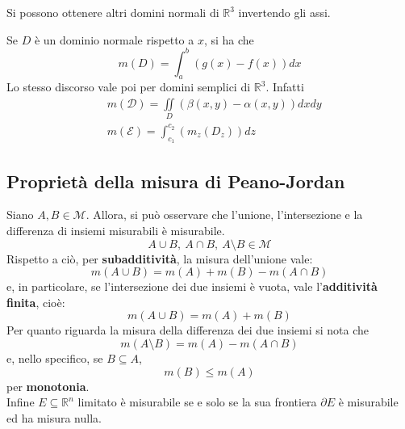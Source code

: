     \begin{oss}
        Si possono ottenere altri domini normali di $\mathbb{R}^3$ invertendo gli assi.
    \end{oss}
    \begin{oss}
        Se $D$ è un dominio normale rispetto a $x$, si ha che
        \begin{equation}
            m(D)= \int_a^b(g(x)-f(x))dx
        \end{equation}
        Lo stesso discorso vale poi per domini semplici di $\mathbb{R}^3$. Infatti
        \begin{equation}
            \begin{aligned}
                &m(\mathcal{D})=\iint\limits_D(\beta(x,y)-\alpha(x,y))dxdy\\
                &m(\mathcal{E})=\int_{c_1}^{c_2}(m_z(D_z))dz
            \end{aligned}
        \end{equation}
    \end{oss}
    \subsection{Proprietà della misura di Peano-Jordan}
    Siano $A, B \in \mathcal{M}$. Allora, si può osservare che l'unione, l'intersezione e la differenza di insiemi misurabili è misurabile.
    \begin{equation}
        A \cup B,\ A \cap B,\ A \setminus B \in \mathcal{M}
    \end{equation}
    Rispetto a ciò, per \textbf{subadditività}, la misura dell'unione vale:
    \begin{equation}
        m(A \cup B) = m(A)+ m(B)- m(A \cap B)
    \end{equation}
    e, in particolare, se l'intersezione dei due insiemi è vuota, vale l'\textbf{additività finita}, cioè:
    \begin{equation}
        m(A \cup B) = m(A)+ m(B)
    \end{equation}
    Per quanto riguarda la misura della differenza dei due insiemi si nota che 
    \begin{equation}
        m(A \setminus B)= m(A)-m(A \cap B)
    \end{equation}
    e, nello specifico, se $B \subseteq A$,
    \begin{equation}
        m(B) \leq m(A)
    \end{equation}
    per \textbf{monotonia}.\\
    Infine $E \subseteq \mathbb{R}^n$ limitato è misurabile se e solo se la sua frontiera $\partial E$ è misurabile ed ha misura nulla.
